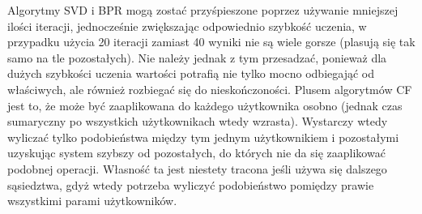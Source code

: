 \documentclass{pracamgr}
\begin{document}
    Algorytmy SVD i BPR mogą zostać przyśpieszone poprzez używanie mniejszej ilości iteracji, jednocześnie zwiększając odpowiednio szybkość uczenia,
    w przypadku użycia 20 iteracji zamiast 40 wyniki nie są wiele gorsze (plasują się tak samo na tle pozostałych). Nie należy jednak z tym przesadzać,
    ponieważ dla dużych szybkości uczenia wartości potrafią nie tylko mocno odbiegająć od właściwych, ale również rozbiegać się do nieskończoności.
    Plusem algorytmów CF jest to, że może być zaaplikowana do każdego użytkownika osobno (jednak czas sumaryczny po wszystkich użytkownikach wtedy wzrasta).
    Wystarczy wtedy wyliczać tylko podobieństwa między tym jednym użytkownikiem i pozostałymi uzyskując system szybszy od pozostałych,
    do których nie da się zaaplikować podobnej operacji. Własność ta jest niestety tracona jeśli używa się dalszego sąsiedztwa, gdyż wtedy potrzeba wyliczyć
    podobieństwo pomiędzy prawie wszystkimi parami użytkowników.
\end{document}
